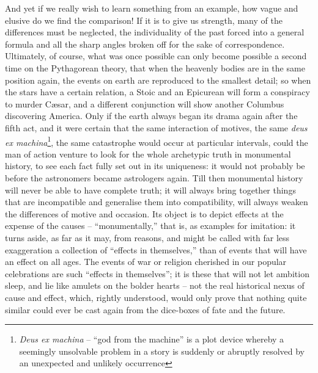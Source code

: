 And yet if we really wish to learn something from an example, how
vague and elusive do we find the comparison! If it is to give us
strength, many of the differences must be neglected, the
individuality of the past forced into a general formula and all the
sharp angles broken off for the sake of correspondence. Ultimately,
of course, what was once possible can only become possible a second
time on the Pythagorean theory, that when the heavenly bodies are in
the same position again, the events on earth are reproduced to the
smallest detail; so when the stars have a certain relation, a Stoic
and an Epicurean will form a conspiracy to murder Cæsar, and a
different conjunction will show another Columbus discovering America.
Only if the earth always began its drama again after the fifth act,
and it were certain that the same interaction of motives, the same
\textit{deus ex machina}\footnote{\textit{Deus ex machina} -- \enquote{god from the machine} is a plot device whereby a seemingly unsolvable problem in a story is suddenly or abruptly resolved by an unexpected and unlikely occurrence}, the same catastrophe would occur at particular
intervals, could the man of action venture to look for the whole
archetypic truth in monumental history, to see each fact fully set
out in its uniqueness: it would not probably be before the
astronomers became astrologers again. Till then monumental history
will never be able to have complete truth; it will always bring
together things that are incompatible and generalise them into
compatibility, will always weaken the differences of motive and
occasion. Its object is to depict effects at the expense of the
causes -- \enquote{monumentally,} that is, as examples for imitation: it turns
aside, as far as it may, from reasons, and might be called with far
less exaggeration a collection of \enquote{effects in themselves,} than of
events that will have an effect on all ages. The events of war or
religion cherished in our popular celebrations are such \enquote{effects in
themselves}; it is these that will not let ambition sleep, and lie
like amulets on the bolder hearts -- not the real historical nexus of
cause and effect, which, rightly understood, would only prove that
nothing quite similar could ever be cast again from the dice-boxes of
fate and the future.


